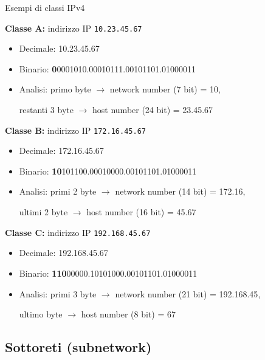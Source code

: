 \documentclass[a4paper,12pt]{report}
\begin{document}
\begin{esempiobox}{Esempi di classi IPv4}

\textbf{Classe A:} indirizzo IP \texttt{10.23.45.67}  
\begin{itemize}[leftmargin=*]
    \item Decimale: 10.23.45.67
    \item Binario: \textcolor{orange!85!black}{\textbf{0}0001010}.\textcolor{yellow!80!black}{00010111.00101101.01000011}  
    \item Analisi: primo byte $\rightarrow$ \textcolor{orange!85!black}{network number (7 bit) = 10}, 
    
    restanti 3 byte $\rightarrow$ \textcolor{yellow!80!black}{host number (24 bit) = 23.45.67}
\end{itemize}

\textbf{Classe B:} indirizzo IP \texttt{172.16.45.67}  
\begin{itemize}[leftmargin=*]
    \item Decimale: 172.16.45.67
    \item Binario: \textcolor{orange!85!black}{\textbf{10}101100.00010000}.\textcolor{yellow!80!black}{00101101.01000011}  
    \item Analisi: primi 2 byte $\rightarrow$ \textcolor{orange!85!black}{network number (14 bit) = 172.16}, 
    
    ultimi 2 byte $\rightarrow$ \textcolor{yellow!80!black}{host number (16 bit) = 45.67}
\end{itemize}

\textbf{Classe C:} indirizzo IP \texttt{192.168.45.67}  
\begin{itemize}[leftmargin=*]
    \item Decimale: 192.168.45.67
    \item Binario: \textcolor{orange!85!black}{\textbf{110}00000.10101000.00101101}.\textcolor{yellow!80!black}{01000011}  
    \item Analisi: primi 3 byte $\rightarrow$ \textcolor{orange!85!black}{network number (21 bit) = 192.168.45}, 
    
    ultimo byte $\rightarrow$ \textcolor{yellow!80!black}{host number (8 bit) = 67}
\end{itemize}

\end{esempiobox}


\newpage
\subsection{Sottoreti (subnetwork)}
\end{document}
